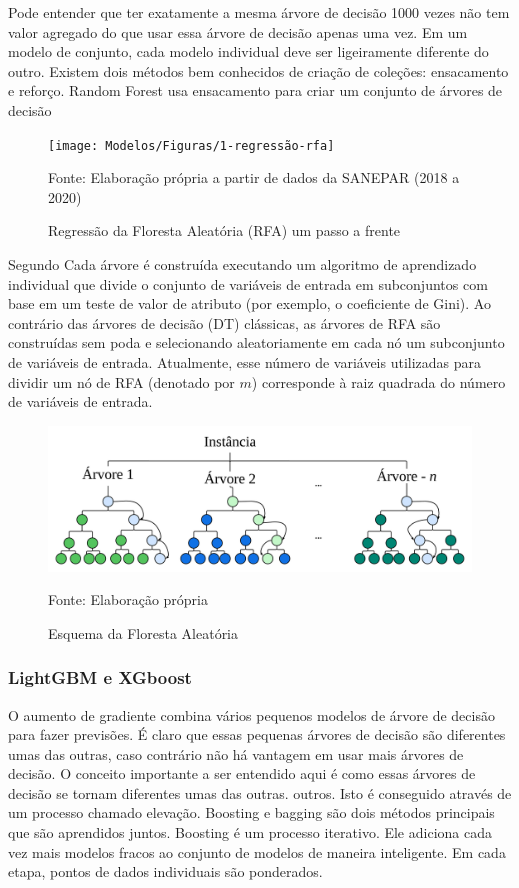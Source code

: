 Pode entender que ter exatamente a mesma árvore de decisão 1000 vezes não tem valor agregado do que usar essa árvore de decisão apenas uma vez.  Em um modelo de conjunto, cada modelo individual deve ser ligeiramente diferente do outro. Existem dois métodos bem conhecidos de criação de coleções: ensacamento e reforço.  Random Forest usa ensacamento para criar um conjunto de árvores de decisão

\begin{figure}[H]
	\centering
	\caption{Regressão da Floresta Aleatória (RFA) um passo a frente}
	\label{fig:1-regressao-rfa}
	\texttt{[image: Modelos/Figuras/1-regressão-rfa]}
	
	Fonte: Elaboração própria a partir de dados da SANEPAR (2018 a 2020)
\end{figure}

Segundo  Cada árvore é construída executando um algoritmo de aprendizado individual que divide o conjunto de variáveis de entrada em subconjuntos com base em um teste de valor de atributo (por exemplo, o coeficiente de Gini). Ao contrário das árvores de decisão (DT) clássicas, as árvores de RFA são construídas sem poda e selecionando aleatoriamente em cada nó um subconjunto de variáveis de entrada. Atualmente, esse número de variáveis utilizadas para dividir um nó de RFA (denotado por $m$) corresponde à raiz quadrada do número de variáveis de entrada.

\begin{figure}[H]
	\centering
	\caption{Esquema da Floresta Aleatória}
	\label{fig:rf}
	\includegraphics[width=1\linewidth]{Modelos/Figuras/RF}
	
	Fonte: Elaboração própria
\end{figure}


\subsubsection{LightGBM e XGboost}\label{subsubsec:lgbxgb}

O aumento de gradiente combina vários pequenos modelos de árvore de decisão para fazer previsões. É claro que essas pequenas árvores de decisão são diferentes umas das outras, caso contrário não há vantagem em usar mais árvores de decisão. O conceito importante a ser entendido aqui é como essas árvores de decisão se tornam diferentes umas das outras. outros. Isto é conseguido através de um processo chamado elevação. Boosting e bagging são dois métodos principais que são aprendidos juntos.  Boosting é um processo iterativo. Ele adiciona cada vez mais modelos fracos ao conjunto de modelos de maneira inteligente. Em cada etapa, pontos de dados individuais são ponderados.  

